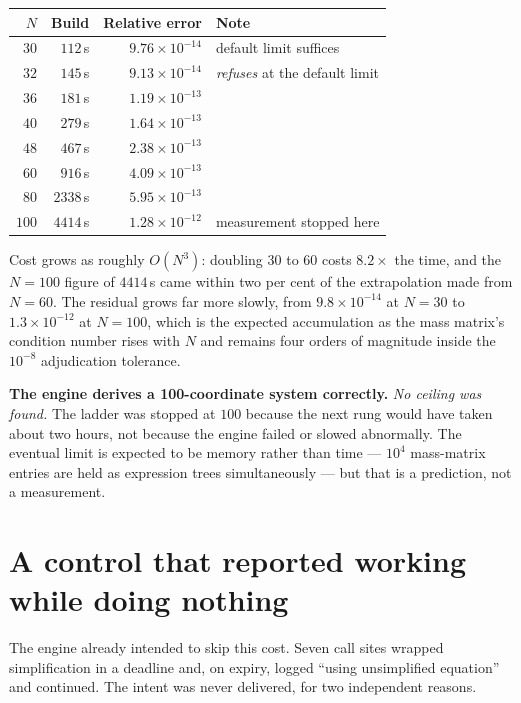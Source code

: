 \documentclass[11pt,a4paper]{article}
\begin{document}
\begin{center}
\begin{tabular}{@{}rrrl@{}}
\toprule
$N$ & \textbf{Build} & \textbf{Relative error} & \textbf{Note} \\
\midrule
$30$ & $112$\,s & $9.76\times10^{-14}$ & default limit suffices \\
$32$ & $145$\,s & $9.13\times10^{-14}$ & \emph{refuses} at the default limit \\
$36$ & $181$\,s & $1.19\times10^{-13}$ & \\
$40$ & $279$\,s & $1.64\times10^{-13}$ & \\
$48$ & $467$\,s & $2.38\times10^{-13}$ & \\
$60$ & $916$\,s & $4.09\times10^{-13}$ & \\
$80$ & $2338$\,s & $5.95\times10^{-13}$ & \\
$100$ & $4414$\,s & $1.28\times10^{-12}$ & measurement stopped here \\
\bottomrule
\end{tabular}
\end{center}

\noindent Cost grows as roughly $O(N^3)$: doubling $30$ to $60$ costs $8.2\times$
the time, and the $N=100$ figure of $4414$\,s came within two per cent of
the extrapolation made from $N=60$. The residual grows far more slowly, from
$9.8\times10^{-14}$ at $N=30$ to $1.3\times10^{-12}$ at $N=100$, which is the
expected accumulation as the mass matrix's condition number rises with $N$ and
remains four orders of magnitude inside the $10^{-8}$ adjudication tolerance.

\textbf{The engine derives a 100-coordinate system correctly.} \emph{No ceiling was
found.} The ladder was stopped at $100$ because the next rung would have taken
about two hours, not because the engine failed or slowed abnormally. The
eventual limit is expected to be memory rather than time --- $10^4$ mass-matrix
entries are held as expression trees simultaneously --- but that is a
prediction, not a measurement.

\section{A control that reported working while doing nothing}

The engine already intended to skip this cost. Seven call sites wrapped
simplification in a deadline and, on expiry, logged ``using unsimplified
equation'' and continued. The intent was never delivered, for two independent
reasons.
\end{document}

